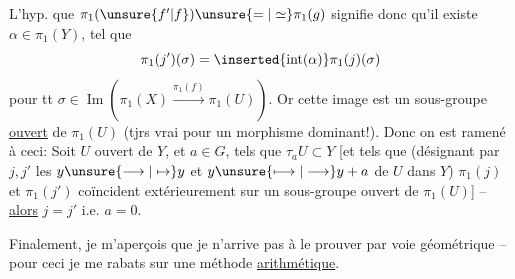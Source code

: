L'hyp. que $\pi_1(\unsure{f'|f})\unsure{=|\simeq}\pi_1(g)$ signifie donc qu'il existe $\alpha\in\pi_1(Y)$, tel que
\[
\pi_1(j')(\sigma)=\inserted{\operatorname{int}(\alpha)}\pi_1(j)(\sigma)
\]
pour tt $\sigma\in\operatorname{Im}(\pi_1(X)\xrightarrow{\pi_1(f)}\pi_1(U))$. Or cette image est un sous-groupe \uline{ouvert} de $\pi_1(U)$ (tjrs vrai pour un morphisme dominant!).  Donc on est ramené à ceci: Soit $U$ ouvert \inserted{$\ne\varnothing$} de $Y$, et $a\in G$, tels que $\tau_aU\subset Y$ [et tels que (désignant par $j,j'$ les   $y\unsure{\longrightarrow|\mapsto}y$ et $y\unsure{\longmapsto|\longrightarrow}y+a$ de $U$ dans $Y$) $\pi_1(j)$ et $\pi_1(j')$ coïncident extérieurement sur un sous-groupe ouvert de $\pi_1(U)$] -- \uline{alors} $j=j'$ i.e. $a=0$.


Finalement, je m'aperçois que je n'arrive pas à le prouver par voie géométrique -- pour ceci je me rabats sur une méthode \uline{arithmétique}.

